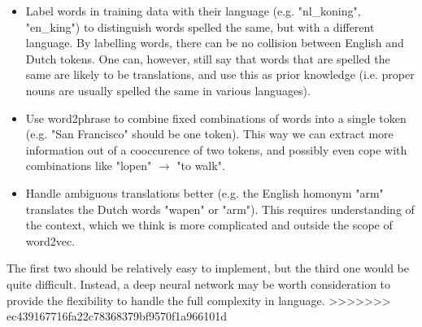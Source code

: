 \begin{itemize}
\item Label words in training data with their language (e.g. "nl\_koning", "en\_king") to distinguish words spelled the same, but with a different language. By labelling words, there can be no collision between English and Dutch tokens. One can, however, still say that words that are spelled the same are likely to be translations, and use this as prior knowledge (i.e. proper nouns are usually spelled the same in various languages).
\item Use word2phrase to combine fixed combinations of words into a single token (e.g. "San Francisco" should be one token). This way we can extract more information out of a cooccurence of two tokens, and possibly even cope with combinations like "lopen" $\to$ "to walk".
\item Handle ambiguous translations better (e.g. the English homonym "arm" translates the Dutch words "wapen" or "arm"). This requires understanding of the context, which we think is more complicated and outside the scope of word2vec.
\end{itemize}

The first two should be relatively easy to implement, but the third one would be quite difficult. Instead, a deep neural network may be worth consideration to provide the flexibility to handle the full complexity in language.
>>>>>>> ec439167716fa22c78368379bf9570f1a966101d
